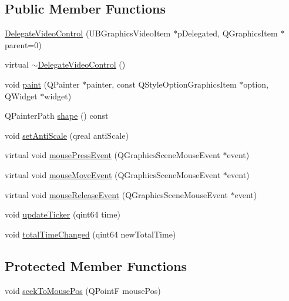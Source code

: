 \subsection*{Public Member Functions}
\begin{DoxyCompactItemize}
\item 
\hyperlink{class_delegate_video_control_a2cda0de2204cd4e0b7683894dc6e4939}{Delegate\-Video\-Control} (U\-B\-Graphics\-Video\-Item $\ast$p\-Delegated, Q\-Graphics\-Item $\ast$parent=0)
\item 
virtual \hyperlink{class_delegate_video_control_a85ea95ed6b0e71326c85fe0ab7cb7a78}{$\sim$\-Delegate\-Video\-Control} ()
\item 
void \hyperlink{class_delegate_video_control_a6e3cf52c12b4597abdb3f5b718dd70a8}{paint} (Q\-Painter $\ast$painter, const Q\-Style\-Option\-Graphics\-Item $\ast$option, Q\-Widget $\ast$widget)
\item 
Q\-Painter\-Path \hyperlink{class_delegate_video_control_a29ca69bde43eb6806715c0c18148a025}{shape} () const 
\item 
void \hyperlink{class_delegate_video_control_abe2110657dafe471044fb471bf302bdf}{set\-Anti\-Scale} (qreal anti\-Scale)
\item 
virtual void \hyperlink{class_delegate_video_control_aff5276144d7294ca9a1d441adce0b87d}{mouse\-Press\-Event} (Q\-Graphics\-Scene\-Mouse\-Event $\ast$event)
\item 
virtual void \hyperlink{class_delegate_video_control_aa69144ac35cac23db1eeed627963b47e}{mouse\-Move\-Event} (Q\-Graphics\-Scene\-Mouse\-Event $\ast$event)
\item 
virtual void \hyperlink{class_delegate_video_control_ada9a2f17b5a3bdb5d8b04b22682fbb30}{mouse\-Release\-Event} (Q\-Graphics\-Scene\-Mouse\-Event $\ast$event)
\item 
void \hyperlink{class_delegate_video_control_a4041dc437477a46abedbe2f60b372bb9}{update\-Ticker} (qint64 time)
\item 
void \hyperlink{class_delegate_video_control_ac4bd67b8519832ffb357dc95487697d7}{total\-Time\-Changed} (qint64 new\-Total\-Time)
\end{DoxyCompactItemize}
\subsection*{Protected Member Functions}
\begin{DoxyCompactItemize}
\item 
void \hyperlink{class_delegate_video_control_a92ed136a0960e6e2f2322390899ac4f9}{seek\-To\-Mouse\-Pos} (Q\-Point\-F mouse\-Pos)
\end{DoxyCompactItemize}

